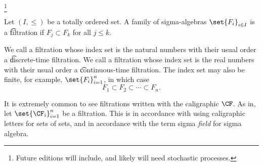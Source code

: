 

\footnote{Future editions will include, and likely will need stochastic processes.}


Let $(I, \leq)$ be a totally ordered set.
A family of sigma-algebras $\set{F_i}_{i \in I}$ is a \t{filtration} if $F_{j} \subset F_{k}$ for all $j \leq k$.

We call a filtration whose index set is the natural numbers with their usual order a \t{discrete-time filtration}.
We call a filtration whose index set is the real numbers with their usual order a \t{continuous-time filtration}.
The index set may also be finite, for example, $\set{F_i}_{i = 1}^{n}$, in which case
\[
  F_1 \subset F_2 \subset \cdots \subset F_n.
\]


It is extremely common to see filtrations written with the caligraphic $\CF$.
As in, let $\set{\CF_{i}}_{i=1}^{n}$ be a filtration.
This is in accordance with using caligraphic letters for sets of sets, and in accordance with the term sigma \textit{field} for sigma algebra.

\blankpage
